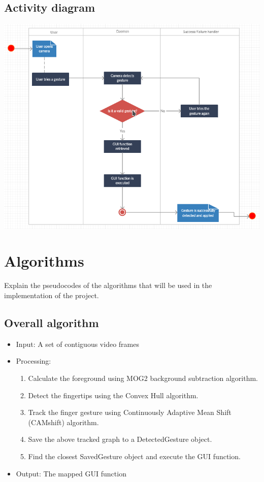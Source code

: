 \documentclass{scrreprt}
\begin{document}
\section{Activity diagram}
\begin{center}
    \includegraphics[scale=0.8]{activitydiagram.png}
\end{center}

\chapter{Algorithms}
Explain the pseudocodes of the algorithms that will be used in the implementation of the project.
\section{Overall algorithm}
\begin{itemize}
    \item Input: A set of contiguous video frames
    \item Processing:
    \begin{enumerate}
        \item Calculate the foreground using MOG2 background subtraction algorithm.
        \item Detect the fingertips using the Convex Hull algorithm.
        \item Track the finger gesture using Continuously Adaptive Mean Shift (CAMshift) algorithm.
        \item Save the above tracked graph to a DetectedGesture object.
        \item Find the closest SavedGesture object and execute the GUI function.
    \end{enumerate}
    \item Output: The mapped GUI function
\end{itemize}
\end{document}
